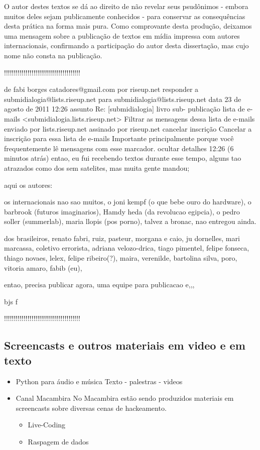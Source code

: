 \begin{itemize}
O autor destes textos se dá ao direito de não revelar seus psudônimos - embora muitos deles
sejam publicamente conhecidos - para conservar as consequências desta prática na
forma mais pura. Como comprovante desta produção, deixamos uma mensagem sobre a publicação
de textos em mídia impressa com autores internacionais,
confirmando a participação do autor desta dissertação, mas cujo
nome não consta na publicação.

!!!!!!!!!!!!!!!!!!!!!!!!!!!!!!!!!!!!!!!

de      fabi borges catadores@gmail.com por  riseup.net 
responder a     submidialogia@lists.riseup.net
para    submidialogia@lists.riseup.net
data    23 de agosto de 2011 12:26
assunto Re: [submidialogia] livro sub- publicação
lista de e-mails        <submidialogia.lists.riseup.net> Filtrar as mensagens dessa lista de e-mails
enviado por     lists.riseup.net
assinado por    riseup.net
cancelar inscrição      Cancelar a inscrição para essa lista de e-mails
        Importante principalmente porque você frequentemente lê mensagens com esse marcador.
ocultar detalhes 12:26 (6 minutos atrás)
entao, eu fui recebendo textos durante esse tempo,
alguns tao atrazados como dos sem satelites, mas muita gente mandou;

aqui os autores:

os internacionais nao sao muitos, o joni kempf (o que bebe ouro do hardware), o barbrook (futuros imaginarios),
Hamdy heda (da revolucao egipcia), o pedro soller (summerlab), maria llopis (pos porno),  talvez a bronac, nao entregou ainda.

dos brasileiros, renato fabri, ruiz, pasteur, morgana e caio, ju dornelles, mari marcassa, coletivo errorista, adriana velozo-drica, tiago pimentel, felipe fonseca, thiago novaes, lelex, felipe ribeiro(?), maira, verenilde,  bartolina silva, poro, vitoria amaro, fabib (eu),

entao, precisa publicar agora,
uma equipe para publicacao e,,, 

bjs
f

!!!!!!!!!!!!!!!!!!!!!!!!!!!!!!!!!!!!!!!

\end{itemize}

\subsection{Screencasts e outros materiais em video e em texto}

\begin{itemize}
    \item Python para áudio e música
	  Texto - palestras - videos

    \item Canal Macambira
No Macambira estão sendo produzidos materiais em screencasts sobre
diversas cenas de hackeamento.

    \begin{itemize}
	\item Live-Coding
	\item Raspagem de dados
    \end{itemize}
\end{itemize}

